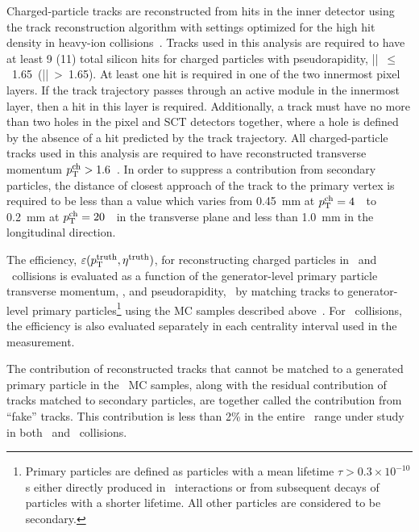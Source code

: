Charged-particle tracks are reconstructed from hits in the inner detector using the 
track reconstruction algorithm with settings optimized for the high hit density in heavy-ion
collisions~\cite{Aaboud:2017all}.
Tracks used in this analysis  are required to have at least 9 (11) total silicon hits for charged particles with pseudorapidity,  \mbox{|\etatrk| $\leq$ 1.65 (|\etatrk| > 1.65)}.  At least one hit is required in one of the two innermost pixel layers.
If the track trajectory passes through an active module in the innermost layer, then 
a hit in this layer is required. Additionally, a track must 
have no more than two holes in the pixel and SCT detectors together, where 
a hole is defined by the absence of a hit predicted by the track 
trajectory. 
All charged-particle tracks used in this analysis are required to have reconstructed transverse momentum $\mbox{$p_{\mathrm{T}}^{\mathrm{ch}}$} > 1.6$~\GeV. In order to suppress a contribution from
secondary particles, the distance of closest approach of the track to the primary vertex is required to be less than a value which varies from  0.45~mm at $\mbox{$p_{\mathrm{T}}^{\mathrm{ch}}$}=4$~\GeV\ to 0.2~mm at $\mbox{$p_{\mathrm{T}}^{\mathrm{ch}}$}=20$~\GeV\ in the transverse plane and less than 1.0~mm in the longitudinal direction.


The efficiency, $\varepsilon(\mbox{$p_{\mathrm{T}}^{\mathrm{truth}}$}, \mbox{$\eta^{\mathrm{truth}}$})$, for reconstructing charged particles in \PbPb\ and \pp\ collisions is evaluated as a function of the generator-level primary particle transverse momentum, \pTtrue, and pseudorapidity, \etatrue\, by matching tracks to generator-level primary particles\footnote{Primary particles are defined as particles with a mean lifetime $\tau>0.3\times 10^{-10}$s either directly produced in \pp\ interactions or from subsequent decays of particles with a shorter lifetime. All other particles are considered to be secondary.} using the MC samples described above~\cite{Aad:2010ah}. For \pbpb\ collisions, the efficiency is also evaluated separately in each centrality interval used in the measurement.
     
The contribution of reconstructed tracks that cannot be matched to a generated primary particle in the \pp\ MC samples, along with the residual contribution of tracks matched to secondary particles, are together called the contribution from ``fake'' tracks. This contribution is less than 2\% in the entire \pttrk\ range under study in both \pp\ and \pbpb\ collisions.  








